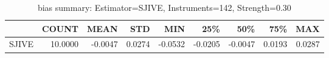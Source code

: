 \begin{table}[ht]
\centering
\caption{bias summary: Estimator=SJIVE, Instruments=142, Strength=0.30}
\begin{tabular}{lrrrrrrrr}
\toprule
 & COUNT & MEAN & STD & MIN & 25\% & 50\% & 75\% & MAX \\
\midrule
SJIVE & 10.0000 & -0.0047 & 0.0274 & -0.0532 & -0.0205 & -0.0047 & 0.0193 & 0.0287 \\
\bottomrule
\end{tabular}
\end{table}
